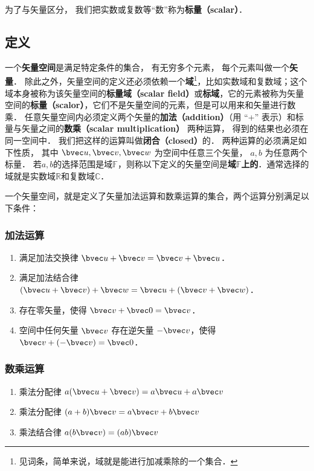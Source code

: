 为了与矢量区分， 我们把实数或复数等“数”称为\textbf{标量（scalar）}．

\subsection{定义}
一个\textbf{矢量空间}是满足特定条件的集合， 有无穷多个元素， 每个元素叫做一个\textbf{矢量}． 除此之外，矢量空间的定义还必须依赖一个\textbf{域}\footnote{见词条，简单来说，域就是能进行加减乘除的一个集合．}，比如实数域和复数域；这个域本身被称为该矢量空间的\textbf{标量域（scalar field）}或\textbf{标域}，它的元素被称为矢量空间的\textbf{标量（scalor）}，它们不是矢量空间的元素，但是可以用来和矢量进行数乘． 任意矢量空间内必须定义两个矢量的\textbf{加法（addition）}（用 “+” 表示）和标量与矢量之间的\textbf{数乘（scalar multiplication）} 两种运算， 得到的结果也必须在同一空间中． 我们把这样的运算叫做\textbf{闭合（closed）}的． 两种运算的必须满足如下性质， 其中 $\bvec u,\bvec v,\bvec w$ 为空间中任意三个矢量， $a,b$ 为任意两个标量． 若$a,b$的选择范围是域$\mathbb{F}$，则称以下定义的矢量空间是\textbf{域}$\mathbb{F}$\textbf{上的}．通常选择的域就是实数域$\mathbb{R}$和复数域$\mathbb{C}$．

一个矢量空间，就是定义了矢量加法运算和数乘运算的集合，两个运算分别满足以下条件：

\subsubsection{加法运算}
\begin{enumerate}
\item 满足加法交换律 $\bvec u + \bvec v = \bvec v + \bvec u$．
\item 满足加法结合律 $(\bvec u + \bvec v) + \bvec w = \bvec u + (\bvec v + \bvec w)$．
\item 存在零矢量，使得 $\bvec v + \bvec 0 = \bvec v$．
\item 空间中任何矢量 $\bvec v$ 存在逆矢量 $-\bvec v$，使得 $\bvec v + (-\bvec v) = \bvec 0$．
\end{enumerate}

\subsubsection{数乘运算}
\begin{enumerate}
\item 乘法分配律 $a(\bvec u + \bvec v) = a\bvec u + a\bvec v$ 
\item 乘法分配律 $(a + b)\bvec v = a\bvec v + b\bvec v$
\item 乘法结合律 $a (b \bvec v) = (ab) \bvec v$
\end{enumerate}

